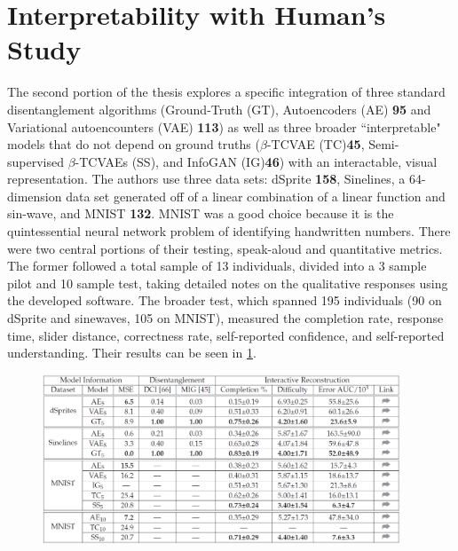 \documentclass[twoside,11pt]{article}
\begin{document}

\section{Interpretability with Human's Study}
\label{sec:explainability}
The second portion of the thesis explores a specific integration of three standard disentanglement algorithms (Ground-Truth (GT), Autoencoders (AE) \textbf{95} and Variational autoencounters (VAE) \textbf{113}) as well as three broader ``interpretable" models that do not depend on ground truths ($\beta$-TCVAE (TC)\textbf{45}, Semi-supervised $\beta$-TCVAEs (SS), and InfoGAN (IG)\textbf{46}) with an interactable, visual representation. The authors use three data sets: dSprite \textbf{158}, Sinelines, a 64-dimension data set generated off of a linear combination of a linear function and sin-wave, and MNIST \textbf{132}. MNIST was a good choice because it is the quintessential neural network problem of identifying handwritten numbers. There were two central portions of their testing, speak-aloud and quantitative metrics. The former followed a total sample of 13 individuals, divided into a 3 sample pilot and 10 sample test, taking detailed notes on the qualitative responses using the developed software. The broader test, which spanned 195 individuals (90 on dSprite and sinewaves, 105 on MNIST), measured the completion rate, response time, slider distance, correctness rate, self-reported confidence, and self-reported understanding. Their results can be seen in \cref{fig:3}. 

\begin{figure}[!ht]
\centering
	\includegraphics[width=0.95\textwidth]{dis_fig3.png}
	\caption{}
	\label{fig:3}
\end{figure}
\end{document}
